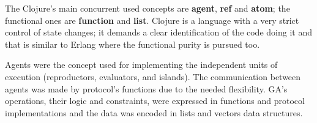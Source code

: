 The Clojure’s main concurrent used concepts are \textbf{agent}, \textbf{ref} and \textbf{atom}; the functional ones are \textbf{function} and \textbf{list}. Clojure is a language with a very strict control of state changes; it demands a clear identification of the code doing it %
 and that is similar to Erlang where the functional purity is pursued too.

Agents were the concept used for implementing the independent units of execution (reproductors, evaluators, and islands). The communication between agents was made by protocol’s functions due to the needed flexibility. GA’s operations, their logic and constraints, were expressed in functions and protocol implementations and the data was encoded in lists and vectors data structures. 